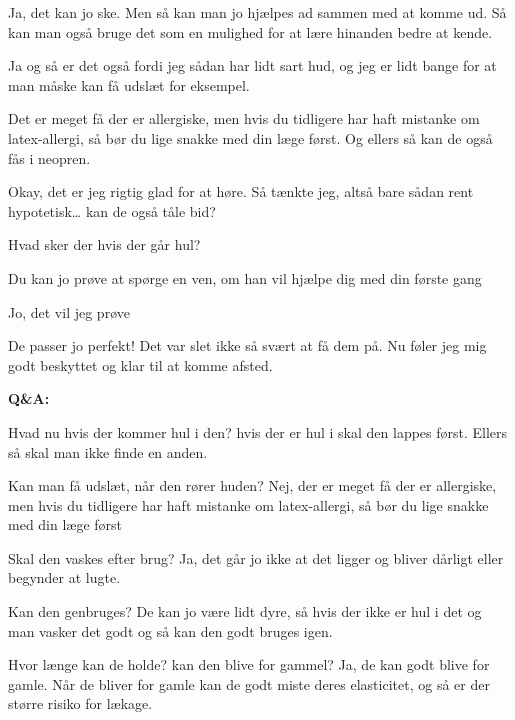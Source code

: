 \documentclass[a4paper,11pt]{article}
\begin{document}
\begin{sketch}
 Ja, det kan jo ske. Men så kan man jo hjælpes ad sammen med at komme ud. Så kan man også bruge det som en mulighed for at lære hinanden bedre at kende.

 Ja og så er det også fordi jeg sådan har lidt sart hud, og jeg er lidt bange for at man måske kan få udslæt for eksempel.

 Det er meget få der er allergiske, men hvis du tidligere har haft mistanke om latex-allergi, så bør du lige snakke med din læge først. Og ellers så kan de også fås i neopren.

 Okay, det er jeg rigtig glad for at høre. Så tænkte jeg, altså bare sådan rent hypotetisk… kan de også tåle bid?


 Hvad sker der hvis der går hul?

 Du kan jo prøve at spørge en ven, om han vil hjælpe dig med din første gang

 Jo, det vil jeg prøve 


 De passer jo perfekt! Det var slet ikke så svært at få dem på. Nu føler jeg mig godt beskyttet og klar til at komme afsted.


\vspace{1cm}

\textbf{Q\&A:}

 Hvad nu hvis der kommer hul i den? 
 hvis der er hul i skal den lappes først. Ellers så skal man ikke finde en anden. 

 Kan man få udslæt, når den rører huden?
 Nej, der er meget få der er allergiske, men hvis du tidligere har haft mistanke om latex-allergi, så bør du lige snakke med din læge først

Skal den vaskes efter brug?
Ja, det går jo ikke at det ligger og bliver dårligt eller begynder at lugte. 

Kan den genbruges? 
De kan jo være lidt dyre, så hvis der ikke er hul i det og man vasker det godt og så kan den godt bruges igen.

Hvor længe kan de holde? kan den blive for gammel?
Ja, de kan godt blive for gamle. Når de bliver for gamle kan de godt miste deres elasticitet, og så er der større risiko for lækage.  


\end{sketch}
\end{document}
